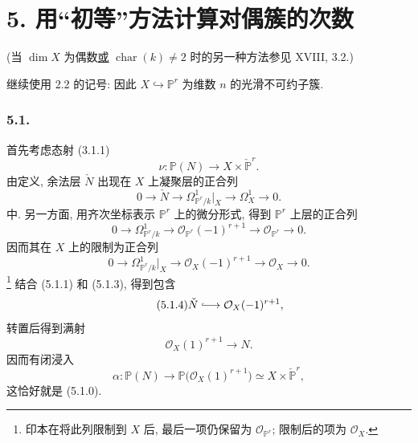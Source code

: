\section*{5. 用“初等”方法计算对偶簇的次数}

(当 $\dim X$ 为偶数\underline{或} $\operatorname{char}(k)\ne2$ 时的另一种方法参见 XVIII, 3.2.)

继续使用 2.2 的记号: 因此 $X\hookrightarrow\mathbb P^r$ 为维数 $n$ 的光滑不可约子簇.

\subsubsection*{5.1.}
首先考虑态射 (3.1.1)
\begin{equation}\tag{5.1.0}
\nu:\mathbb P(N)\longrightarrow X\times\check{\mathbb P}^{r}.
\end{equation}
由定义, 余法层 $\check N$ 出现在 $X$ 上凝聚层的正合列
\begin{equation}\tag{5.1.1}
0\longrightarrow\check N
\longrightarrow\Omega^1_{\mathbb P^r/k}|_X
\longrightarrow\Omega^1_X
\longrightarrow0.
\end{equation}
中. 另一方面, 用齐次坐标表示 $\mathbb P^r$ 上的微分形式, 得到 $\mathbb P^r$ 上层的正合列
\begin{equation}\tag{5.1.2}
0\longrightarrow\Omega^1_{\mathbb P^r/k}
\longrightarrow\mathcal O_{\mathbb P^r}(-1)^{r+1}
\longrightarrow\mathcal O_{\mathbb P^r}
\longrightarrow0.
\end{equation}
因而其在 $X$ 上的限制为正合列
\begin{equation}\tag{5.1.3}
0\longrightarrow\Omega^1_{\mathbb P^r/k}|_X
\longrightarrow\mathcal O_X(-1)^{r+1}
\longrightarrow\mathcal O_X
\longrightarrow0.
\end{equation}
\footnote{印本在将此列限制到 $X$ 后, 最后一项仍保留为 $\mathcal O_{\mathbb P^r}$; 限制后的项为 $\mathcal O_X$.}
结合 (5.1.1) 和 (5.1.3), 得到包含
\begin{equation}\tag{5.1.4}
\check N\lhook\joinrel\longrightarrow\mathcal O_X(-1)^{r+1},
\end{equation}
转置后得到满射
\begin{equation}\tag{5.1.5}
\mathcal O_X(1)^{r+1}\longrightarrow N.
\end{equation}
因而有闭浸入
\begin{equation}\tag{5.1.6}
\alpha:\mathbb P(N)
\longrightarrow\mathbb P\bigl(\mathcal O_X(1)^{r+1}\bigr)
\simeq X\times\check{\mathbb P}^{r},
\end{equation}
这恰好就是 (5.1.0).

